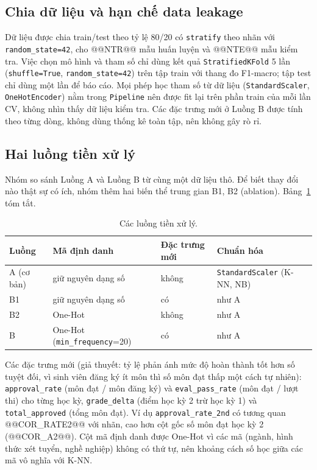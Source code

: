 \documentclass[12pt,a4paper]{article}
\begin{document}
\subsection{Chia dữ liệu và hạn chế data leakage}
Dữ liệu được chia train/test theo tỷ lệ 80/20 có \texttt{stratify} theo nhãn với \texttt{random\_state=42}, cho @@NTR@@ mẫu huấn luyện và
@@NTE@@ mẫu kiểm tra. Việc chọn mô hình và tham số chỉ dùng kết quả \texttt{StratifiedKFold} 5 lần (\texttt{shuffle=True},
\texttt{random\_state=42}) trên tập train với thang đo F1-macro; tập test chỉ dùng một lần để báo cáo. Mọi phép học tham số từ dữ liệu
(\texttt{StandardScaler}, \texttt{OneHotEncoder}) nằm trong \texttt{Pipeline} nên được fit lại trên phần train của mỗi lần CV, không
nhìn thấy dữ liệu kiểm tra. Các đặc trưng mới ở Luồng B được tính theo từng dòng, không dùng thống kê toàn tập, nên không gây rò rỉ.

\subsection{Hai luồng tiền xử lý}
Nhóm so sánh Luồng A và Luồng B từ cùng một dữ liệu thô. Để biết thay đổi nào thật sự có ích, nhóm thêm hai biến thể trung gian B1, B2
(ablation). Bảng~\ref{tab:flows} tóm tắt.
\begin{table}[H]\centering\small
\begin{tabular}{@{}lp{3.2cm}p{3.6cm}p{4.2cm}@{}}\toprule
Luồng & Mã định danh & Đặc trưng mới & Chuẩn hóa\\\midrule
A (cơ bản) & giữ nguyên dạng số & không & \texttt{StandardScaler} (K-NN, NB)\\
B1 & giữ nguyên dạng số & có & như A\\
B2 & One-Hot & không & như A\\
B & One-Hot (\texttt{min\_frequency}=20) & có & như A\\\bottomrule
\end{tabular}\caption{Các luồng tiền xử lý.}\label{tab:flows}\end{table}
Các đặc trưng mới (giả thuyết: tỷ lệ phản ánh mức độ hoàn thành tốt hơn số tuyệt đối, vì sinh viên đăng ký ít môn thì số môn đạt thấp một
cách tự nhiên): \texttt{approval\_rate} (môn đạt / môn đăng ký) và \texttt{eval\_pass\_rate} (môn đạt / lượt thi) cho từng học kỳ,
\texttt{grade\_delta} (điểm học kỳ 2 trừ học kỳ 1) và \texttt{total\_approved} (tổng môn đạt). Ví dụ \texttt{approval\_rate\_2nd}
có tương quan @@COR_RATE2@@ với nhãn, cao hơn cột gốc số môn đạt học kỳ 2 (@@COR_A2@@). Cột mã định danh được One-Hot vì các mã
(ngành, hình thức xét tuyển, nghề nghiệp) không có thứ tự, nên khoảng cách số học giữa các mã vô nghĩa với K-NN.
\end{document}
